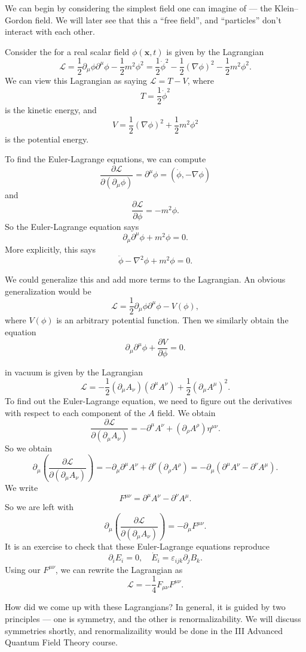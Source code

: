\documentclass[a4paper]{article}
\begin{document}
We can begin by considering the simplest field one can imagine of --- the Klein--Gordon field. We will later see that this a ``free field'', and ``particles'' don't interact with each other.

\begin{eg}
  Consider the  for a real scalar field $\phi(\mathbf{x}, t)$ is given by the Lagrangian
  \[
    \mathcal{L} = \frac{1}{2} \partial_\mu \phi \partial^\mu \phi - \frac{1}{2}m^2 \phi^2 = \frac{1}{2} \dot{\phi}^2 - \frac{1}{2} (\nabla \phi)^2 - \frac{1}{2} m^2 \phi^2.
  \]
  We can view this Lagrangian as saying $\mathcal{L} = T - V$, where
  \[
    T = \frac{1}{2} \dot{\phi}^2
  \]
  is the kinetic energy, and
  \[
    V = \frac{1}{2} (\nabla \phi)^2 + \frac{1}{2}m^2 \phi^2
  \]
  is the potential energy.

  To find the Euler-Lagrange equations, we can compute
  \[
    \frac{\partial \mathcal{L}}{\partial(\partial_\mu \phi)} = \partial^\mu \phi = (\dot{\phi}, -\nabla \phi)
  \]
  and
  \[
    \frac{\partial \mathcal{L}}{\partial \phi} = -m^2 \phi.
  \]
  So the Euler-Lagrange equation says
  \[
    \partial_\mu \partial^\mu \phi + m^2 \phi = 0.
  \]
  More explicitly, this says
  \[
    \ddot{\phi} - \nabla^2 \phi + m^2 \phi = 0.
  \]
\end{eg}
We could generalize this and add more terms to the Lagrangian. An obvious generalization would be
\[
  \mathcal{L} = \frac{1}{2} \partial_\mu \phi \partial^\mu \phi - V(\phi),
\]
where $V(\phi)$ is an arbitrary potential function. Then we similarly obtain the equation
\[
  \partial_\mu \partial^\mu \phi + \frac{\partial V}{\partial \phi} = 0.
\]

\begin{eg}
   in vacuum is given by the Lagrangian
  \[
    \mathcal{L} = -\frac{1}{2} (\partial_\mu A_\nu)(\partial^\mu A^\nu) + \frac{1}{2}(\partial_\mu A^\mu)^2.
  \]
  To find out the Euler-Lagrange equation, we need to figure out the derivatives with respect to each component of the $A$ field. We obtain
  \[
    \frac{\partial \mathcal{L}}{\partial(\partial_\mu A_\nu)} = -\partial^\mu A^\nu + (\partial_\rho A^\rho) \eta^{\mu\nu}.
  \]
  So we obtain
  \[
    \partial_\mu \left(\frac{\partial \mathcal{L}}{\partial(\partial_\mu A_\nu)}\right) = - \partial_\mu\partial^\mu A^\nu + \partial^\nu (\partial_\rho A^\rho) = - \partial_\mu (\partial^\mu A^\nu - \partial^\nu A^\mu).
  \]
  We write
  \[
    F^{\mu\nu} = \partial^\mu A^\nu - \partial^\nu A^\mu.
  \]
  So we are left with
  \[
    \partial_\mu \left(\frac{\partial \mathcal{L}}{\partial(\partial_\mu A_\nu)}\right) = -\partial_\mu F^{\mu\nu}.
  \]
  It is an exercise to check that these Euler-Lagrange equations reproduce
  \[
    \partial_i E_i = 0,\quad \dot{E}_i = \varepsilon_{ijk} \partial_j B_k.
  \]
  Using our $F^{\mu\nu}$, we can rewrite the Lagrangian as
  \[
    \mathcal{L} = -\frac{1}{4} F_{\mu\nu}F^{\mu\nu}.
  \]
\end{eg}
How did we come up with these Lagrangians? In general, it is guided by two principles --- one is symmetry, and the other is renormalizability. We will discuss symmetries shortly, and renormalizaility would be done in the III Advanced Quantum Field Theory course.
\end{document}
